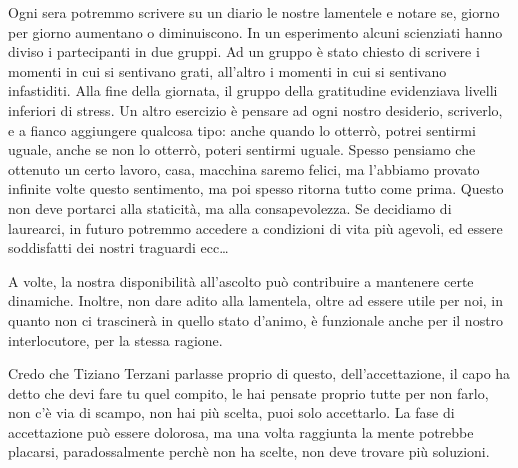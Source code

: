 \documentclass[12pt]{book} %
\begin{document}
\begin{mdframed}[linewidth=1pt]
Ogni sera potremmo scrivere su un diario le nostre lamentele e notare se, giorno per giorno
aumentano o diminuiscono. In un esperimento alcuni scienziati hanno diviso i partecipanti in due gruppi. Ad
un gruppo è stato chiesto di scrivere i momenti in cui si sentivano grati, all'altro i momenti in
cui si sentivano infastiditi. Alla fine della giornata, il gruppo della gratitudine evidenziava livelli inferiori di stress.
Un altro esercizio è pensare ad ogni nostro desiderio, scriverlo, e a fianco aggiungere qualcosa tipo: anche quando lo otterrò, potrei sentirmi uguale, anche se non lo otterrò, poteri sentirmi uguale.
Spesso pensiamo che ottenuto un certo lavoro, casa, macchina saremo felici, ma l'abbiamo provato infinite volte questo sentimento, ma poi spesso ritorna tutto come prima. Questo non deve portarci alla staticità, ma alla consapevolezza. Se decidiamo di laurearci, in futuro potremmo accedere a condizioni di vita più agevoli, ed essere soddisfatti dei nostri traguardi ecc…

A volte, la nostra disponibilità all’ascolto può contribuire a mantenere certe dinamiche. Inoltre, non dare adito alla lamentela, oltre ad essere utile per noi, in quanto non ci trascinerà in quello stato d'animo, è funzionale anche per il nostro interlocutore, per la stessa ragione.
\end{mdframed}

Credo che Tiziano Terzani parlasse proprio di questo, dell'accettazione, il capo ha detto che devi
fare tu quel compito, le hai pensate proprio tutte per non farlo, non c'è via di scampo, non hai
più scelta, puoi solo accettarlo. La fase di accettazione può essere dolorosa, ma una volta raggiunta la mente potrebbe placarsi, paradossalmente perchè non ha scelte, non deve trovare più soluzioni.
\end{document}
